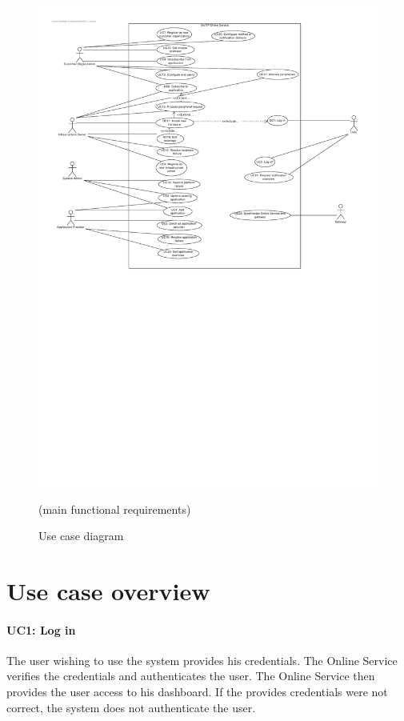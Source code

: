 \documentclass[english]{sareport}
\begin{document}
\begin{figure}[H]
    \centering
    \includegraphics[width=\textwidth]{Use_Case_Diagram.pdf}
    \caption{Use case diagram} (main functional requirements) \label{fig:Use_Case_Diagram}
\end{figure}

\section{Use case overview}\label{sec:uc_overview}
\paragraph{UC1: Log in}
The user wishing to use the system provides his credentials.
The Online Service verifies the credentials and authenticates the user.
The Online Service then provides the user access to his dashboard.
If the provides credentials were not correct, the system does not authenticate the user.
\end{document}
